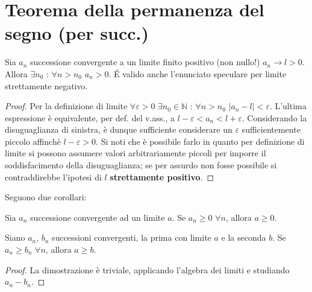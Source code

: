 \documentclass[10pt, oneside]{book}
\theoremstyle{plain}
\begin{document}
\section{Teorema della permanenza del segno (per succ.)}
\begin{ther}
    Sia $a_n$ successione convergente a un limite finito positivo (non nullo!) $a_n \rightarrow l > 0$. Allora $\exists n_0$ : $\forall n > n_0$ $a_n > 0$. \'E valido anche l'enunciato speculare per limite strettamente negativo.
\end{ther}
\begin{proof}
    Per la definizione di limite $\forall \varepsilon > 0$ $\exists n_0 \in \mathbb{N}$ : $\forall n > n_0$ $|a_n - l| < \varepsilon$. L'ultima espressione è equivalente, per def. del v.ass., a $l - \varepsilon < a_n < l + \varepsilon$. Considerando la disuguaglianza di sinistra, è dunque sufficiente considerare un $\varepsilon$ sufficientemente piccolo affinchè $l - \varepsilon > 0$. Si noti che è possibile farlo in quanto per definizione di limite si possono assumere valori arbitrariamente piccoli per imporre il soddisfacimento della disuguaglianza; se per assurdo non fosse possibile si contraddirebbe l'ipotesi di $l$ \textbf{strettamente positivo}.
\end{proof}
Seguono due corollari:
\begin{cor}
    Sia $a_n$ successione convergente ad un limite $a$. Se $a_n \geq 0$ $\forall n$, allora $a \geq 0$.
\end{cor}
\begin{cor}
    Siano $a_n$, $b_n$ successioni convergenti, la prima con limite $a$ e la seconda $b$. Se $a_n \geq b_n$ $\forall n$, allora $a \geq b$.
\end{cor}
\begin{proof}
    La dimostrazione è triviale, applicando l'algebra dei limiti e studiando $a_n - b_n$.
\end{proof}
\end{document}
